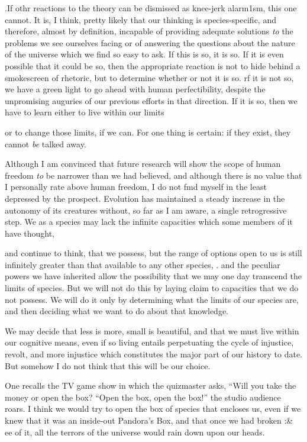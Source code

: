 .If othr reactions to the theory can be dismissed as knee-jerk alarm1sm, this one cannot. It is, I think, pretty likely that our think\-ing is species-specific, and therefore, almost by definition, incapable of providing adequate solutions \textit{to }the problems we see ourselves facing or of answering the questions about the nature of the universe which we find so easy to ask. If this is so, it is so. If it is even possible that it could be so, then the appropriate reaction is not to hide behind a smokescreen of rhetoric, but to determine whether or not it is so. rf it is not so, we have a green light to go ahead with human perfectibility, despite the unpromising auguries of our previous efforts in that direc\-tion. If it is so, then we have to learn either to live within our limits

or to change those limits, if we can. For one thing is certain: if they exist, they cannot \textit{be} talked away.

Although I am convinced that future research will show the scope of human freedom \textit{to} be narrower than we had believed, and although there is no value that I personally rate above human freedom, I do not fmd myself in the least depressed by the prospect. Evolution has maintained a steady increase in the autonomy of its creatures with\-out, so far as I am aware, a single retrogressive step. We as a species may lack the infinite capacities which some members of it have thought,


and continue to think, that we possess, but the range of options open to us is still infinitely greater than that available to any other species, . and the peculiar powers we have inherited allow the possibility that we may one day transcend the limits of species. But we will not do this by laying claim to capacities that we do not possess. We will do it only by determining what the limits of our species are, and then decid\-ing what we want to do about that knowledge.

We may decide that less is more, small is beautiful, and that we must live within our cognitive means, even if so living entails perpetu\-ating the cycle of injustice, revolt, and more injustice which constitutes the major part of our history to date. But somehow I do not think that this will be our choice.
 
One recalls the TV game show in which the quizmaster asks, ``Will you take the money or open the box?{\textquotedbl} ``Open the box, open the box!'' the studio audience roars. I think we would try to open the box of species that encloses us, even if we knew that it was an inside-out Pandora's Box, and that once we had broken :\& ee of it, all the terrors of the universe would rain down upon our heads.
 
